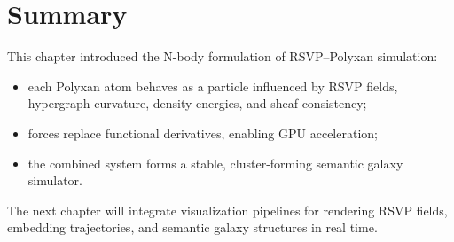 \section{Summary}

This chapter introduced the N-body formulation of RSVP--Polyxan simulation:

\begin{itemize}
  \item each Polyxan atom behaves as a particle influenced by RSVP fields,
        hypergraph curvature, density energies, and sheaf consistency;
  \item forces replace functional derivatives, enabling GPU acceleration;
  \item the combined system forms a stable,
        cluster-forming semantic galaxy simulator.
\end{itemize}

The next chapter will integrate visualization pipelines
for rendering RSVP fields, embedding trajectories,
and semantic galaxy structures in real time.
